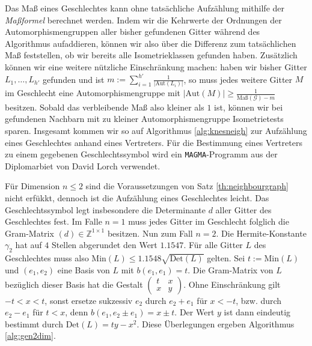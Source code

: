 \documentclass[12pt,a4paper,halfparskip,headsepline,bibtotocnumbered]{scrreprt}
\theoremstyle{nummermitklammern}
\theoremstyle{nonumberbreak}
\newcommand{\Z}{\mathbb{Z}}
\newcommand{\Det}{\text{Det}}
\newcommand{\Min}{\text{Min}}
\newcommand{\Aut}{\text{Aut}}
\begin{document}
Das Maß eines Geschlechtes kann ohne tatsächliche Aufzählung mithilfe der \textit{Maßformel} berechnet werden. Indem wir die Kehrwerte der Ordnungen der Automorphismengruppen aller bisher gefundenen Gitter während des Algorithmus aufaddieren, können wir also über die Differenz zum tatsächlichen Maß feststellen, ob wir bereits alle Isometrieklassen gefunden haben. Zusätzlich können wir eine weitere nützliche Einschränkung machen: haben wir bisher Gitter $L_1, \dots, L_{h'}$ gefunden und ist $m := \sum_{i=1}^{h'} \frac{1}{\vert \Aut(L_i) \vert}$, so muss jedes weitere Gitter $M$ im Geschlecht eine Automorphismengruppe mit $\vert \Aut(M) \vert \geq \frac{1}{\text{Maß}(\mathcal{G}) - m}$ besitzen. Sobald das verbleibende Maß also kleiner als $1$ ist, können wir bei gefundenen Nachbarn mit zu kleiner Automorphismengruppe Isometrietests sparen. Insgesamt kommen wir so auf Algorithmus \eqref{alg:knesneigh} zur Aufzählung eines Geschlechtes anhand eines Vertreters. Für die Bestimmung eines Vertreters zu einem gegebenen Geschlechtssymbol wird ein \texttt{MAGMA}-Programm aus der Diplomarbiet von David Lorch \cite{lorch} verwendet.\par
Für Dimension $n \leq 2$ sind die Voraussetzungen von Satz \eqref{th:neighbourgraph} nicht erfükkt, dennoch ist die Aufzählung eines Geschlechtes leicht. Das Geschlechtssymbol legt insbesondere die Determinante $d$ aller Gitter des Geschlechtes fest. Im Falle $n = 1$ muss jedes Gitter im Geschlecht folglich die Gram-Matrix $(d) \in \Z^{1 \times 1}$ besitzen. Nun zum Fall $n = 2$. Die Hermite-Konstante $\gamma_2$ hat auf $4$ Stellen abgerundet den Wert $1.1547$. Für alle Gitter $L$ des Geschlechtes muss also $\Min(L) \leq 1.1548 \sqrt{\Det(L)}$ gelten. Sei $t := \Min(L)$ und $(e_1, e_2)$ eine Basis von $L$ mit $b(e_1, e_1) = t$. Die Gram-Matrix von $L$ bezüglich dieser Basis hat die Gestalt $\left(\begin{matrix} t & x\\x & y\end{matrix}\right)$. Ohne Einschränkung gilt $-t < x < t$, sonst ersetze sukzessiv $e_2$ durch $e_2 + e_1$ für $x < -t$, bzw. durch $e_2 - e_1$ für $t < x$, denn $b(e_1, e_2 \pm e_1) = x \pm t$. Der Wert $y$ ist dann eindeutig bestimmt durch $\Det(L) =  ty - x^2$. Diese Überlegungen ergeben Algorithmus \eqref{alg:gen2dim}.
\end{document}
